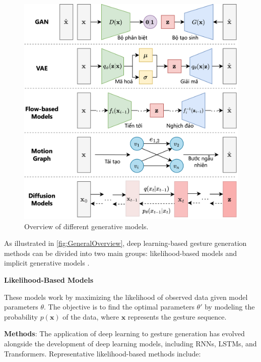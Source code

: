 \begin{figure}[b]
	\centering
	\includegraphics[width=\linewidth]{images/GeneralOverview}
	\caption{Overview of different generative models.}
	\label{fig:GeneralOverview}
\end{figure}

As illustrated in \autoref{fig:GeneralOverview}, deep learning-based gesture generation methods can be divided into two main groups: likelihood-based models and implicit generative models \cite{song2021score}.


\textbf{Likelihood-Based Models}

These models work by maximizing the likelihood of observed data given model parameters $\theta$. The objective is to find the optimal parameters $\theta'$ by modeling the probability $p(\mathbf{x})$ of the data, where $\mathbf{x}$ represents the gesture sequence.


\textbf{Methods}: The application of deep learning to gesture generation has evolved alongside the development of deep learning models, including RNNs, LSTMs, and Transformers. Representative likelihood-based methods include:

